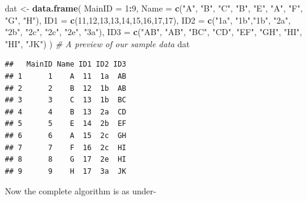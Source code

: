 \documentclass[
]{book}
\newenvironment{Shaded}{\begin{snugshade}}{\end{snugshade}}
\newcommand{\AttributeTok}[1]{\textcolor[rgb]{0.13,0.29,0.53}{#1}}
\newcommand{\CommentTok}[1]{\textcolor[rgb]{0.56,0.35,0.01}{\textit{#1}}}
\newcommand{\DecValTok}[1]{\textcolor[rgb]{0.00,0.00,0.81}{#1}}
\newcommand{\FunctionTok}[1]{\textcolor[rgb]{0.13,0.29,0.53}{\textbf{#1}}}
\newcommand{\NormalTok}[1]{#1}
\newcommand{\OtherTok}[1]{\textcolor[rgb]{0.56,0.35,0.01}{#1}}
\newcommand{\SpecialCharTok}[1]{\textcolor[rgb]{0.81,0.36,0.00}{\textbf{#1}}}
\newcommand{\StringTok}[1]{\textcolor[rgb]{0.31,0.60,0.02}{#1}}
\begin{document}
\begin{Shaded}
\begin{Highlighting}[]
\NormalTok{dat }\OtherTok{\textless{}{-}} \FunctionTok{data.frame}\NormalTok{(}
  \AttributeTok{MainID =} \DecValTok{1}\SpecialCharTok{:}\DecValTok{9}\NormalTok{,}
  \AttributeTok{Name =} \FunctionTok{c}\NormalTok{(}\StringTok{"A"}\NormalTok{, }\StringTok{"B"}\NormalTok{, }\StringTok{"C"}\NormalTok{, }\StringTok{"B"}\NormalTok{, }\StringTok{"E"}\NormalTok{, }\StringTok{"A"}\NormalTok{, }\StringTok{"F"}\NormalTok{, }\StringTok{"G"}\NormalTok{, }\StringTok{"H"}\NormalTok{),}
  \AttributeTok{ID1 =} \FunctionTok{c}\NormalTok{(}\DecValTok{11}\NormalTok{,}\DecValTok{12}\NormalTok{,}\DecValTok{13}\NormalTok{,}\DecValTok{13}\NormalTok{,}\DecValTok{14}\NormalTok{,}\DecValTok{15}\NormalTok{,}\DecValTok{16}\NormalTok{,}\DecValTok{17}\NormalTok{,}\DecValTok{17}\NormalTok{),}
  \AttributeTok{ID2 =} \FunctionTok{c}\NormalTok{(}\StringTok{"1a"}\NormalTok{, }\StringTok{"1b"}\NormalTok{,}\StringTok{"1b"}\NormalTok{, }\StringTok{"2a"}\NormalTok{, }\StringTok{"2b"}\NormalTok{, }\StringTok{"2c"}\NormalTok{, }\StringTok{"2c"}\NormalTok{, }\StringTok{"2e"}\NormalTok{, }\StringTok{"3a"}\NormalTok{),}
  \AttributeTok{ID3 =} \FunctionTok{c}\NormalTok{(}\StringTok{"AB"}\NormalTok{, }\StringTok{"AB"}\NormalTok{, }\StringTok{"BC"}\NormalTok{, }\StringTok{"CD"}\NormalTok{, }\StringTok{"EF"}\NormalTok{, }\StringTok{"GH"}\NormalTok{, }\StringTok{"HI"}\NormalTok{, }\StringTok{"HI"}\NormalTok{, }\StringTok{"JK"}\NormalTok{)}
\NormalTok{)}
\CommentTok{\# A preview of our sample data}
\NormalTok{dat}
\end{Highlighting}
\end{Shaded}

\begin{verbatim}
##   MainID Name ID1 ID2 ID3
## 1      1    A  11  1a  AB
## 2      2    B  12  1b  AB
## 3      3    C  13  1b  BC
## 4      4    B  13  2a  CD
## 5      5    E  14  2b  EF
## 6      6    A  15  2c  GH
## 7      7    F  16  2c  HI
## 8      8    G  17  2e  HI
## 9      9    H  17  3a  JK
\end{verbatim}

Now the complete algorithm is as under-
\end{document}
